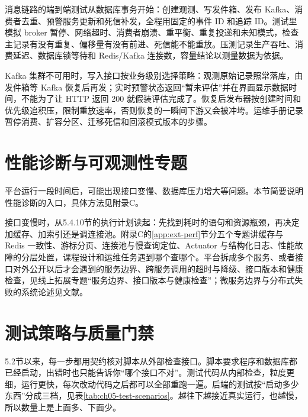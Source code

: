 消息链路的端到端测试从数据库事务开始：创建观测、写发件箱、发布 Kafka、消费者去重、预警服务更新和死信补发，全程用固定的事件 ID 和追踪 ID。测试里模拟 broker 暂停、网络超时、消费者崩溃、重平衡、重复投递和未知模式，检查主记录有没有重复、偏移量有没有前进、死信能不能重放。压测记录生产吞吐、消费延迟、数据库锁等待和 Redis/Kafka 连接数，容量结论以测量数据为依据。

Kafka 集群不可用时，写入接口按业务级别选择策略：观测原始记录照常落库，由发件箱等 Kafka 恢复后再发；实时预警状态返回“暂未评估”并在界面显示数据时间，不能为了让 HTTP 返回 200 就假装评估完成了。恢复后发布器按创建时间和优先级追积压，限制重放速率，否则恢复的一瞬间下游又会被冲垮。运维手册记录暂停消费、扩容分区、迁移死信和回滚模式版本的步骤。

\section{性能诊断与可观测性专题}\label{sec:ch05-perf-pointer}

平台运行一段时间后，可能出现接口变慢、数据库压力增大等问题。本节简要说明性能诊断的入口，具体方法见附录C。

接口变慢时，从5.4.10节的执行计划读起：先找到耗时的语句和资源瓶颈，再决定加缓存、加索引还是调连接池。附录C的\ref{app:ext-perf}节分五个专题讲缓存与 Redis 一致性、游标分页、连接池与慢查询定位、Actuator 与结构化日志、性能故障的分层处置，课程设计和运维任务遇到哪个查哪个。平台拆成多个服务、或者接口对外公开以后才会遇到的服务边界、跨服务调用的超时与降级、接口版本和健康检查，见线上拓展专题“服务边界、接口版本与健康检查”；微服务边界与分布式失败的系统论述见文献\cite{newman2021}。

\section{测试策略与质量门禁}


5.2节以来，每一步都用契约核对脚本从外部检查接口。脚本要求程序和数据库都已经启动，出错时也只能告诉你“哪个接口不对”。测试代码从内部检查，粒度更细，运行更快，每次改动代码之后都可以全部重跑一遍。后端的测试按“启动多少东西”分成三档，见表\ref{tab:ch05-test-scenarios}。越往下越接近真实运行，也越慢，所以数量上是上面多、下面少。

